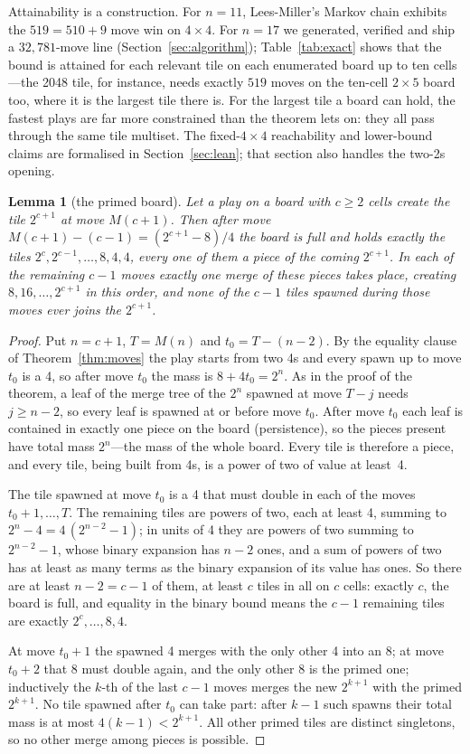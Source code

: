 \documentclass[11pt]{article}
\newtheorem{lemma}[theorem]{Lemma}
\theoremstyle{definition}
\theoremstyle{remark}
\begin{document}
Attainability is a construction. For $n=11$, Lees-Miller's Markov chain
\cite{leesmiller2017} exhibits the $519=510+9$ move win on $4\times4$. For
$n=17$ we generated, verified and ship a $32{,}781$-move line
(Section~\ref{sec:algorithm}); Table~\ref{tab:exact} shows that the bound
is attained for each relevant tile on each enumerated board up to ten
cells---the 2048
tile, for instance, needs exactly $519$ moves on the ten-cell $2\times5$
board too, where it is the largest tile there is. For the
largest tile a board can hold, the fastest plays are far more constrained
than the theorem lets on: they all pass through the same tile multiset.
The fixed-$4\times4$ reachability and lower-bound claims are formalised
in Section~\ref{sec:lean}; that section also handles the two-2s opening.

\begin{lemma}[the primed board]\label{lem:primed}
Let a play on a board with $c\ge2$ cells create the tile $2^{c+1}$ at move
$M(c+1)$. Then after move $M(c+1)-(c-1)=(2^{c+1}-8)/4$ the board is full
and holds exactly the tiles $2^c,2^{c-1},\dots,8,4,4$, every one of them
a piece of the coming $2^{c+1}$. In each of the remaining $c-1$ moves
exactly one merge of these pieces takes place, creating $8,16,\dots,2^{c+1}$
in this order, and none of the $c-1$ tiles spawned during those moves ever
joins the $2^{c+1}$.
\end{lemma}
\begin{proof}
Put $n=c+1$, $T=M(n)$ and $t_0=T-(n-2)$. By the equality clause of
Theorem~\ref{thm:moves} the play starts from two 4s and every spawn up to
move $t_0$ is a 4, so after move $t_0$ the mass is $8+4t_0=2^n$. As in the
proof of the theorem, a leaf of the merge tree of the $2^n$ spawned at move
$T-j$ needs $j\ge n-2$, so every leaf is spawned at or before move $t_0$.
After move $t_0$ each leaf is contained in exactly one piece on the board
(persistence), so the pieces present have total mass $2^n$---the mass of
the whole board. Every tile is therefore a piece, and every tile, being
built from 4s, is a power of two of value at least~4.

The tile spawned at move $t_0$ is a 4 that must double in each of the
moves $t_0+1,\dots,T$. The remaining tiles are powers of two, each at
least 4, summing to $2^n-4=4\,(2^{n-2}-1)$; in units of 4 they are powers
of two summing to $2^{n-2}-1$, whose binary expansion has $n-2$ ones, and a
sum of powers of two has at least as many terms as the binary expansion of
its value has ones. So there are at least $n-2=c-1$ of them, at least $c$
tiles in all on $c$ cells: exactly $c$, the board is full, and equality in
the binary bound means the $c-1$ remaining tiles are exactly
$2^{c},\dots,8,4$.

At move $t_0+1$ the spawned 4 merges with the only other 4 into an 8; at
move $t_0+2$ that 8 must double again, and the only other 8 is the primed
one; inductively the $k$-th of the last $c-1$ moves merges the new
$2^{k+1}$ with the primed $2^{k+1}$. No tile spawned after $t_0$ can take
part: after $k-1$ such spawns their total mass is at most $4(k-1)<2^{k+1}$.
All other primed tiles are distinct singletons, so no other merge among
pieces is possible.
\end{proof}
\end{document}
